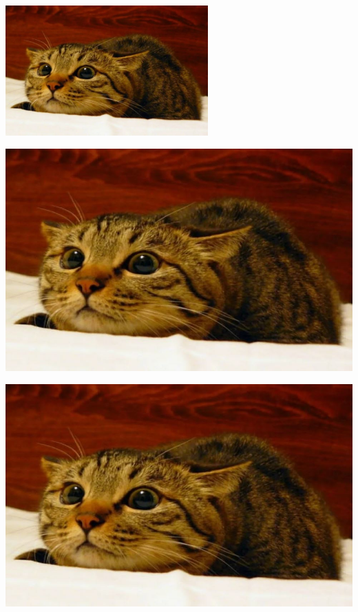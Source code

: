 \documentclass{article}
\begin{document}
\begin{center}
\includegraphics[angle=90, height=5cm]{cat}
\end{center}

\begin{center}
\includegraphics[scale=0.7]{cat}
\end{center}

\begin{center}
\includegraphics[clip, trim = 50 50 210 100]{cat}
\end{center}
\end{document}
